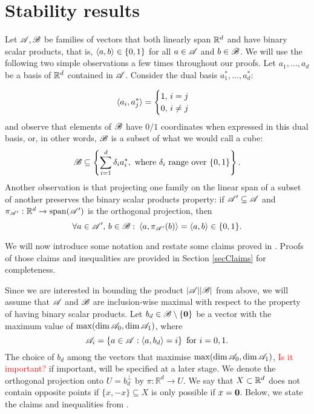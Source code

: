 \section{Stability results}\label{secStability}

Let ${\mathscr{A}}, {\mathscr{B}}$ be families of vectors that both linearly span ${\mathbb{R}}^d$ and have binary scalar products, that is, $\langle a, b \rangle \in \{0,1\}$ for all $a \in {\mathscr{A}}$ and $b \in {\mathscr{B}}$. We will use the following two simple observations a few times throughout our proofs. Let $a_1, \ldots, a_d$ be a basis of ${\mathbb{R}}^d$ contained in ${\mathscr{A}}$. Consider the dual basis $a_1^*, \ldots, a_d^*$:

\[
    \langle a_i, a_j^* \rangle = 
    \begin{cases}
        1,\, i = j \\
        0,\, i\neq j
    \end{cases}
\]
and observe that elements of ${\mathscr{B}}$ have $0/1$ coordinates when expressed in this dual basis, or, in other words, ${\mathscr{B}}$ is a subset of what we would call a cube: 
\[
    {\mathscr{B}} \subseteq \left\{\sum_{i=1}^d \delta_i a_i^*, \text{ where } \delta_i \text{ range over } \{0, 1\}\right\}.
\]
Another observation is that projecting one family on the linear span of a subset of another preserves the binary scalar products property: if ${\mathscr{A}}' \subseteq {\mathscr{A}}$ and $\pi_{{\mathscr{A}}'}: {\mathbb{R}}^d \rightarrow \operatorname{span}({\mathscr{A}}')$ is the orthogonal projection, then
\[
    \forall a \in {\mathscr{A}}',\, b \in {\mathscr{B}}:\: \langle a, \pi_{{\mathscr{A}}'}(b) \rangle = \langle a, b \rangle \in \{0,1\}. 
\]

\noindent We will now introduce some notation and restate some claims proved in \cite{kupavskii22}. Proofs of those claims and inequalities are provided in Section \ref{secClaims} for completeness.

\noindent Since we are interested in bounding the product $|{\mathscr{A}}||{\mathscr{B}}|$ from above, we will assume that ${\mathscr{A}}$ and ${\mathscr{B}}$ are inclusion-wise maximal with respect to the property of having binary scalar products. Let $b_d \in {\mathscr{B}} \setminus \{\mathbf{0}\}$ be a vector with the maximum value of $\operatorname{max}(\operatorname{dim}{\mathscr{A}}_0,\operatorname{dim}{\mathscr{A}}_1)$, where 
\[
    {\mathscr{A}}_i=\left\{a \in {\mathscr{A}}:\left\langle a, b_d\right\rangle=i\right\} \text{ for } i=0, 1.
\]
The choice of $b_d$ among the vectors that maximise $\operatorname{max}(\operatorname{dim}{\mathscr{A}}_0,\operatorname{dim}{\mathscr{A}}_1)$, \textcolor{red}{Is it important?}  if important, will be specified at a later stage. We denote the orthogonal projection onto $U=b_d^\bot$ by $\pi: \mathbb{R}^d \rightarrow U$. We say that $X\subset {\mathbb{R}}^d$ does not contain opposite points if  $\{x,-x\}\subseteq X$ is only possible if $x=\mathbf{0}$. Below, we state the claims and inequalities from \cite{kupavskii22}.

